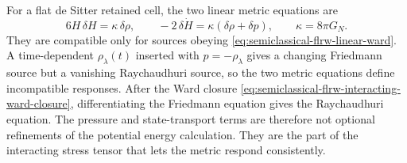 \begin{controlledapproximation}
For a flat de Sitter retained cell, the two linear metric equations are
\begin{equation}
  6H\,\delta H
  =
  \kappa\,\delta\rho,
  \qquad
  -2\,\delta\dot H
  =
  \kappa(\delta\rho+\delta p),
  \qquad
  \kappa=8\pi G_N .
  \label{eq:semiclassical-flrw-linear-friedmann-raychaudhuri}
\end{equation}
They are compatible only for sources obeying
\eqref{eq:semiclassical-flrw-linear-ward}.  A time-dependent
\(\rho_\lambda(t)\) inserted with \(p=-\rho_\lambda\) gives a changing
Friedmann source but a vanishing Raychaudhuri source, so the two metric
equations define incompatible responses.  After the Ward closure
\eqref{eq:semiclassical-flrw-interacting-ward-closure}, differentiating the
Friedmann equation gives the Raychaudhuri equation.  The pressure and
state-transport terms are therefore not optional refinements of the potential
energy calculation.  They are the part of the interacting stress tensor that
lets the metric respond consistently.


\end{controlledapproximation}
